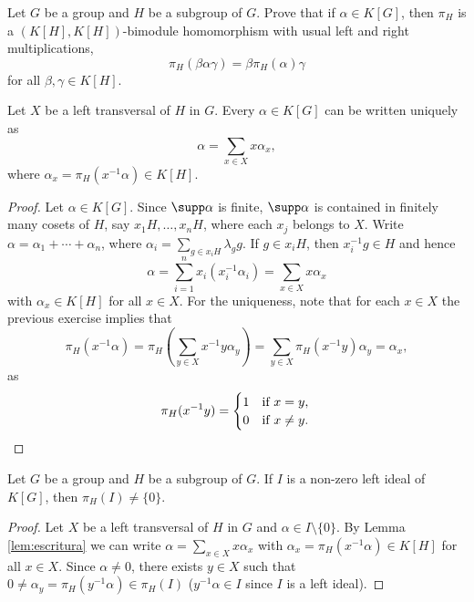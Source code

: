 \begin{exercise}
	Let $G$ be a group and $H$ be a subgroup of $G$. Prove that
	if $\alpha\in
	K[G]$, then $\pi_H$ is a $(K[H],K[H])$-bimodule homomorphism
	with usual left and right multiplications,
	\[
		\pi_H(\beta\alpha\gamma)=\beta\pi_H(\alpha)\gamma
	\]
	for all $\beta,\gamma\in K[H]$.
\end{exercise}


\begin{lemma}
	\label{lem:escritura}
	Let $X$ be a left transversal of $H$ in $G$. Every $\alpha\in K[G]$ can be written
	uniquely as 
	\[
	\alpha=\sum_{x\in X}x\alpha_x,
	\]
	where $\alpha_x=\pi_H(x^{-1}\alpha)\in K[H]$.
\end{lemma}

\begin{proof}
	Let $\alpha\in K[G]$. Since $\supp\alpha$ is finite, $\supp\alpha$ is contained 
    in finitely many cosets of $H$, say $x_1H,\dots,x_nH$, where each 
	$x_j$ belongs to $X$. Write $\alpha=\alpha_1+\cdots+\alpha_n$,
	where $\alpha_i=\sum_{g\in x_iH}\lambda_gg$. If $g\in x_iH$, then 
	$x_i^{-1}g\in H$ and hence 
	\[
		\alpha=\sum_{i=1}^n x_i(x_i^{-1}\alpha_i)=\sum_{x\in X}x\alpha_x
	\]
	with $\alpha_x\in K[H]$ for all $x\in X$. For the uniqueness, note that 
	for each  $x\in X$ the previous exercise implies that  
	\[
		\pi_H(x^{-1}\alpha)
		=\pi_H\left(\sum_{y\in X}x^{-1}y\alpha_y\right)
		=\sum_{y\in X}\pi_H(x^{-1}y)\alpha_y=\alpha_x, 
	\]
	as  
	\[
		\pi_H(x^{-1}y)=\begin{cases}
		1 & \text{if $x=y$},\\
		0 & \text{if $x\ne y$}.
	\end{cases}\qedhere 
	\]
\end{proof}

\begin{lemma}
	\label{lem:ideal_pi}
	Let $G$ be a group and $H$ be a subgroup of $G$. If $I$ is a non-zero 
	left ideal
	of $K[G]$, then  $\pi_H(I)\ne\{0\}$.
\end{lemma}

\begin{proof}
	Let $X$ be a left transversal of $H$ in $G$ and $\alpha\in I\setminus\{0\}$. By Lemma
	\ref{lem:escritura} we can write $\alpha=\sum_{x\in
	X}x\alpha_x$ with $\alpha_x=\pi_H(x^{-1}\alpha)\in K[H]$ for all $x\in X$.
	Since $\alpha\ne0$, there exists $y\in X$ such that $0\ne
	\alpha_y=\pi_H(y^{-1}\alpha)\in\pi_H(I)$ ($y^{-1}\alpha\in I$ since $I$ is 
    a left ideal).
\end{proof}

